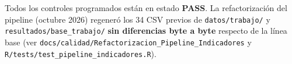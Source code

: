 Todos los controles programados están en estado \textbf{PASS}. La refactorización del pipeline (octubre 2026) regeneró los 34 CSV previos de \texttt{datos/trabajo/} y \texttt{resultados/base\_trabajo/} \textbf{sin diferencias byte a byte} respecto de la línea base (ver \texttt{docs/calidad/Refactorizacion\_Pipeline\_Indicadores} y \texttt{R/tests/test\_pipeline\_indicadores.R}).

